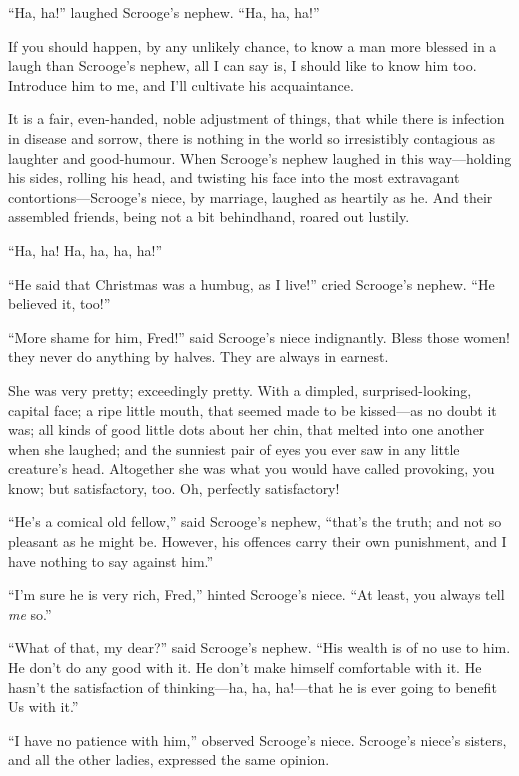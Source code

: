 \documentclass[paper=5.5in:8.5in,BCOR=15mm,twoside,DIV=15,headinclude=off,12pt,chapterprefix=off,openany,headings=huge]{scrbook} %
\begin{document}
\enquote{Ha, ha!} laughed Scrooge's nephew. \enquote{Ha, ha, ha!}

If you should happen, by any unlikely chance, to know a man more blessed in a laugh than Scrooge's nephew, all I can say is, I should like to know him too. Introduce him to me, and I'll cultivate his acquaintance.

It is a fair, even-handed, noble adjustment of things, that while there is infection in disease and sorrow, there is nothing in the world so irresistibly contagious as laughter and good-humour. When Scrooge's nephew laughed in this way—holding his sides, rolling his head, and twisting his face into the most extravagant contortions—Scrooge's niece, by marriage, laughed as heartily as he. And their assembled friends, being not a bit behindhand, roared out lustily.

\enquote{Ha, ha! Ha, ha, ha, ha!}

\enquote{He said that Christmas was a humbug, as I live!} cried Scrooge's nephew. \enquote{He believed it, too!}

\enquote{More shame for him, Fred!} said Scrooge's niece indignantly. Bless those women! they never do anything by halves. They are always in earnest.

She was very pretty; exceedingly pretty. With a dimpled, surprised-looking, capital face; a ripe little mouth, that seemed made to be kissed—as no doubt it was; all kinds of good little dots about her chin, that melted into one another when she laughed; and the sunniest pair of eyes you ever saw in any little creature's head. Altogether she was what you would have called provoking, you know; but satisfactory, too. Oh, perfectly satisfactory!

\enquote{He's a comical old fellow,} said Scrooge's nephew, \enquote{that's the truth; and not so pleasant as he might be. However, his offences carry their own punishment, and I have nothing to say against him.}

\enquote{I'm sure he is very rich, Fred,} hinted Scrooge's niece. \enquote{At least, you always tell \textit{me} so.}

\enquote{What of that, my dear?} said Scrooge's nephew. \enquote{His wealth is of no use to him. He don't do any good with it. He don't make himself comfortable with it. He hasn't the satisfaction of thinking—ha, ha, ha!—that he is ever going to benefit Us with it.}

\enquote{I have no patience with him,} observed Scrooge's niece. Scrooge's niece's sisters, and all the other ladies, expressed the same opinion.
\end{document}
